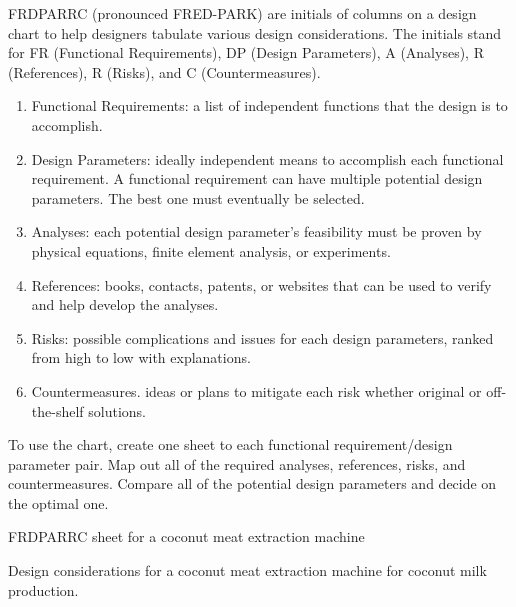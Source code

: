 \documentclass[
10pt,
a4paper,
openany,
svgnames,
]{book}
\begin{document}
FRDPARRC (pronounced FRED-PARK) are initials of columns on a design chart to help designers tabulate various design considerations. The initials stand for FR (Functional Requirements), DP (Design Parameters), A (Analyses), R (References), R (Risks), and C (Countermeasures).

\begin{enumerate}
\item Functional Requirements: a list of independent functions that the design is to accomplish.
\item Design Parameters: ideally independent means to accomplish each functional requirement. A functional requirement can have multiple potential design parameters. The best one must eventually be selected.
\item Analyses: each potential design parameter’s feasibility must be proven by physical equations, finite element analysis, or experiments.
\item References: books, contacts, patents, or websites that can be used to verify and help develop the analyses.
\item Risks: possible complications and issues for each design parameters, ranked from high to low with explanations.
\item Countermeasures. ideas or plans to mitigate each risk whether original or off-the-shelf solutions.
\end{enumerate}

To use the chart, create one sheet to each functional requirement/design parameter pair. Map out all of the required analyses, references, risks, and countermeasures. Compare all of the potential design parameters and decide on the optimal one.

\begin{example}
  FRDPARRC sheet for a coconut meat extraction machine

  Design considerations for a coconut meat extraction machine for
  coconut milk production.
\end{example}
\end{document}
